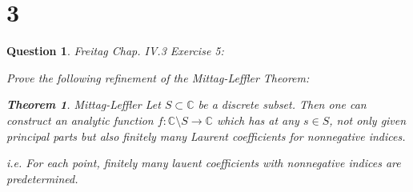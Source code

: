 \documentclass{article}
\newtheorem{theorem}{Theorem}
\newtheorem{question}{Question}
\begin{document}
\begin{comment}
\hfil

Lastly, given the above partial fraction series, it only has simple poles at all $\sqrt{n}$ (where $n\in\mathbb{N}$); also, if we analyze the residue at each point, we get:
$$\forall v\in \mathbb{N},\quad f(z)=\sum_{n=1}^{\infty}\left(\frac{\sqrt{n}}{z-\sqrt{n}}+\sum_{k=0}^{3}\left(\frac{z}{\sqrt{n}}\right)^k\right) = \frac{\sqrt{v}}{z-\sqrt{v}}+\sum_{k=0}^{3}\left(\frac{z}{\sqrt{v}}\right)^k+\sum_{n=1,n\neq v}^{\infty}\left(\frac{\sqrt{n}}{z-\sqrt{n}}+\sum_{k=0}^{3}\left(\frac{z}{\sqrt{n}}\right)^k\right)$$

$$Res(f(z);\sqrt{v})=\lim_{z\rightarrow\sqrt{v}}(z-\sqrt{v})f(z)$$
$$=\lim_{z\rightarrow\sqrt{v}}(z-\sqrt{v})\frac{\sqrt{v}}{z-\sqrt{v}}+(z-\sqrt{v})\left[\sum_{k=0}^{3}\left(\frac{z}{\sqrt{v}}\right)^k+\sum_{n=1,n\neq v}^{\infty}\left(\frac{\sqrt{n}}{z-\sqrt{n}}+\sum_{k=0}^{3}\left(\frac{z}{\sqrt{n}}\right)^k\right)\right] = \sqrt{v}$$
(Since the second sum is defined at $z=\sqrt{v}$ due to the normal convergence of the series, then the second term converges to $0$, while the first term converges to $\sqrt{v}$).

Hence, the above series is one of the meromorphic functions satisfying the desired property.
\end{comment}

\break

\section*{3}
\begin{myBox}[]{}
    \begin{question}
        Freitag Chap. IV.3 Exercise 5:

        Prove the following refinement of the Mittag-Leffler Theorem:
        \begin{theorem}{Mittag-Leffler}
            Let $S\subset \mathbb{C}$ be a discrete subset. Then one can construct an analytic function $f:\mathbb{C}\setminus S\rightarrow \mathbb{C}$
            which has at any $s\in S$, not only given principal parts but also finitely many Laurent coefficients for nonnegative indices.
        \end{theorem}

        i.e. For each point, finitely many lauent coefficients with nonnegative indices are predetermined.
    \end{question}
\end{myBox}
\end{document}
